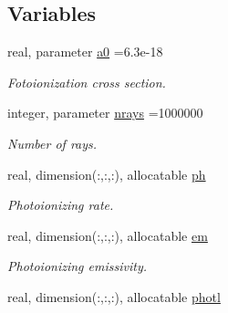 \subsection*{Variables}
\begin{DoxyCompactItemize}
\item 
\hypertarget{namespacedifrad_a0062472e34b740c2c1cb5084d3284056}{}real, parameter \hyperlink{namespacedifrad_a0062472e34b740c2c1cb5084d3284056}{a0} =6.\+3e-\/18\label{namespacedifrad_a0062472e34b740c2c1cb5084d3284056}

\begin{DoxyCompactList}\small\item\em Fotoionization cross section. \end{DoxyCompactList}\item 
\hypertarget{namespacedifrad_aac6943b42d4dede95a3296bdc29c629a}{}integer, parameter \hyperlink{namespacedifrad_aac6943b42d4dede95a3296bdc29c629a}{nrays} =1000000\label{namespacedifrad_aac6943b42d4dede95a3296bdc29c629a}

\begin{DoxyCompactList}\small\item\em Number of rays. \end{DoxyCompactList}\item 
\hypertarget{namespacedifrad_ab532f1879434284f63aa97c79c305236}{}real, dimension(\+:,\+:,\+:), allocatable \hyperlink{namespacedifrad_ab532f1879434284f63aa97c79c305236}{ph}\label{namespacedifrad_ab532f1879434284f63aa97c79c305236}

\begin{DoxyCompactList}\small\item\em Photoionizing rate. \end{DoxyCompactList}\item 
\hypertarget{namespacedifrad_a7d908916fd1e050b9c5ba48771186d5b}{}real, dimension(\+:,\+:,\+:), allocatable \hyperlink{namespacedifrad_a7d908916fd1e050b9c5ba48771186d5b}{em}\label{namespacedifrad_a7d908916fd1e050b9c5ba48771186d5b}

\begin{DoxyCompactList}\small\item\em Photoionizing emissivity. \end{DoxyCompactList}\item 
\hypertarget{namespacedifrad_a3d6a043ec876c626f11238b6260a036a}{}real, dimension(\+:,\+:,\+:), allocatable \hyperlink{namespacedifrad_a3d6a043ec876c626f11238b6260a036a}{photl}\label{namespacedifrad_a3d6a043ec876c626f11238b6260a036a}


\end{DoxyCompactItemize}
